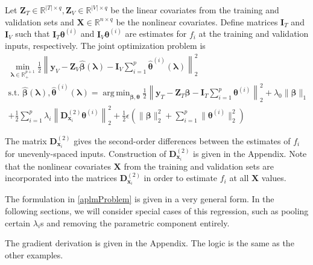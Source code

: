 \documentclass{statsoc}
\DeclareMathOperator*{\argmin}{arg\,min}
\begin{document}
Let $\boldsymbol{Z}_T \in \mathbb{R}^{|T| \times q}, \boldsymbol{Z}_V \in \mathbb{R}^{|V| \times q}$ be the linear covariates from the training and validation sets and $\boldsymbol X \in \mathbb{R}^{n \times q}$ be the nonlinear covariates. Define matrices $\boldsymbol{I}_T$ and $\boldsymbol{I}_V$ such that $\boldsymbol I_T \boldsymbol{\theta}^{(i)}$ and $\boldsymbol I_V \boldsymbol{\theta}^{(i)}$ are estimates for $f_i$ at the training and validation inputs, respectively. The joint optimization problem is
\begin{equation}
\begin{array}{c}
\min_{\boldsymbol\lambda \in \mathbb{R}^{p+1}_{+}} \frac{1}{2}
\left \|
\boldsymbol{y}_V
- \boldsymbol{Z}_V\hat{\boldsymbol{\beta}}(\boldsymbol{\lambda})
- \boldsymbol{I}_V \sum_{i=1}^p \hat{\boldsymbol{\theta}}^{(i)}(\boldsymbol{\lambda})
\right \|^2_2 \\
\text{s.t. }
\hat{\boldsymbol{\beta}}(\boldsymbol{\lambda}),
\hat{\boldsymbol{\theta}}^{(i)}(\boldsymbol{\lambda}) =
\argmin_{\boldsymbol{\beta}, \boldsymbol{\theta}}
\frac{1}{2} \left \|
\boldsymbol{y}_T
- \boldsymbol{Z}_T \boldsymbol{\beta}
- \boldsymbol{I}_T \sum_{i=1}^p \boldsymbol{\theta}^{(i)} \right \|^2_2
+ \lambda_0 \| \boldsymbol{\beta} \|_1 \\
+ \frac{1}{2} \sum_{i=1}^p \lambda_i \left \| \boldsymbol{D}^{(2)}_{\boldsymbol{x}_i} \boldsymbol{\theta}^{(i)} \right \|_2^2
+ \frac{1}{2} \epsilon \left( \| \boldsymbol{\beta} \|_2^2 + \sum_{i=1}^p \| \boldsymbol{\theta}^{(i)} \|_2^2 \right )
\end{array}
\label{aplmProblem}
\end{equation}

The matrix $\boldsymbol{D}^{(2)}_{\boldsymbol{x}_i}$ gives the second-order differences between the estimates of $f_i$ for unevenly-spaced inputs. Construction of $\boldsymbol{D}^{(2)}_{\boldsymbol{x}_i}$ is given in the Appendix. Note that the nonlinear covariates $\boldsymbol X$ from the training and validation sets are incorporated into the matrices $\boldsymbol{D}^{(2)}_{\boldsymbol{x}_i}$ in order to estimate $f_i$ at all $\boldsymbol X$ values.

The formulation in \ref{aplmProblem} is given in a very general form. In the following sections, we will consider special cases of this regression, such as pooling certain $\lambda_i$s and removing the parametric component entirely.

The gradient derivation is given in the Appendix. The logic is the same as the other examples.
\end{document}
